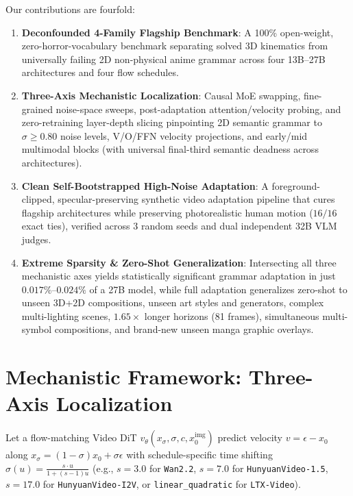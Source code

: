 \documentclass[10pt,twocolumn,letterpaper]{article}
\begin{document}
Our contributions are fourfold:
\begin{enumerate}
    \item \textbf{Deconfounded 4-Family Flagship Benchmark}: A 100\% open-weight, zero-horror-vocabulary benchmark separating solved 3D kinematics from universally failing 2D non-physical anime grammar across four 13B--27B architectures and four flow schedules.
    \item \textbf{Three-Axis Mechanistic Localization}: Causal MoE swapping, fine-grained noise-space sweeps, post-adaptation attention/velocity probing, and zero-retraining layer-depth slicing pinpointing 2D semantic grammar to $\sigma \ge 0.80$ noise levels, V/O/FFN velocity projections, and early/mid multimodal blocks (with universal final-third semantic deadness across architectures).
    \item \textbf{Clean Self-Bootstrapped High-Noise Adaptation}: A foreground-clipped, specular-preserving synthetic video adaptation pipeline that cures flagship architectures while preserving photorealistic human motion ($16/16$ exact ties), verified across 3 random seeds and dual independent 32B VLM judges.
    \item \textbf{Extreme Sparsity \& Zero-Shot Generalization}: Intersecting all three mechanistic axes yields statistically significant grammar adaptation in just $0.017\%$--$0.024\%$ of a 27B model, while full adaptation generalizes zero-shot to unseen 3D+2D compositions, unseen art styles and generators, complex multi-lighting scenes, $1.65\times$ longer horizons (81 frames), simultaneous multi-symbol compositions, and brand-new unseen manga graphic overlays.
\end{enumerate}

\section{Mechanistic Framework: Three-Axis Localization}
Let a flow-matching Video DiT $v_\theta(x_\sigma, \sigma, c, x_0^{\text{img}})$ predict velocity $v = \epsilon - x_0$ along $x_\sigma = (1 - \sigma) x_0 + \sigma \epsilon$ with schedule-specific time shifting $\sigma(u) = \frac{s \cdot u}{1 + (s - 1) u}$ (e.g., $s=3.0$ for \texttt{Wan2.2}, $s=7.0$ for \texttt{HunyuanVideo-1.5}, $s=17.0$ for \texttt{HunyuanVideo-I2V}, or \texttt{linear\_quadratic} for \texttt{LTX-Video}).
\end{document}
